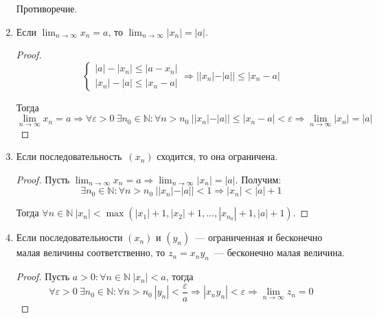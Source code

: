 \begin{enumerate}
\begin{proofcontra}
	Противоречие.
	\end{proofcontra}
	
	\item Если $\displaystyle \lim_{n \to \infty} x_n = a$, то $\displaystyle \lim_{n \to \infty} |x_n| = |a|$.
	\begin{proof}
	\begin{equation*}
	\begin{cases}
	|a| - |x_n| \leqslant |a - x_n| \\
	|x_n| - |a| \leqslant |x_n - a|
	\end{cases}
	\Rightarrow ||x_n| - |a|| \leqslant |x_n - a|
	\end{equation*}
	
	Тогда
	\begin{equation*}
	\lim_{n \to \infty} x_n = a \Rightarrow
	\forall \varepsilon > 0 \ \exists n_0 \in \mathbb N \colon \forall n > n_0 \ ||x_n| - |a|| \leqslant |x_n - a| < \varepsilon \Rightarrow
	\lim_{n \to \infty} |x_n| = |a|
	\end{equation*}
	\end{proof}
	
	\item Если последовательность~$(x_n)$ сходится, то она ограничена.
	\begin{proof}
	Пусть $\displaystyle \lim_{n \to \infty} x_n = a \Rightarrow \lim_{n \to \infty} |x_n| = |a|$.
	Получим:
	\begin{equation*}
	\exists n_0 \in \mathbb N \colon \forall n > n_0 \ ||x_n| - |a|| < 1 \Rightarrow |x_n| < |a| + 1
	\end{equation*}
	
	Тогда $\forall n \in \mathbb N \ |x_n| < \max(|x_1| + 1, |x_2| + 1, \ldots, |x_{n_0}| + 1, |a| + 1)$.
	\end{proof}
	
	\item Если последовательности $(x_n)$ и $(y_n)$~--- ограниченная и бесконечно малая величины соответственно, то $z_n = x_n y_n$~--- бесконечно малая величина.
	\begin{proof}
	Пусть $a > 0 \colon \forall n \in \mathbb N \ |x_n| < a$, тогда
	\begin{equation*}
	\forall \varepsilon > 0 \ \exists n_0 \in \mathbb N \colon
	\forall n > n_0 \ |y_n| < \frac\varepsilon{a} \Rightarrow
	|x_n y_n| < \varepsilon \Rightarrow
	\lim_{n \to \infty} z_n = 0
	\end{equation*}
	\end{proof}
	

\end{enumerate}

